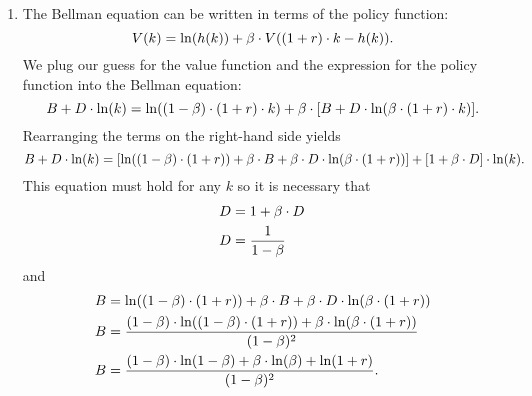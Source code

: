 \documentclass[letterpaper,12pt,leqno]{article}
\begin{document}
\begin{enumerate}
\item The Bellman equation can be written in terms of the policy function:
\[V(k)=\ln(h(k))+\b\cdot V((1+r)\cdot k-h(k)).\]
We plug our guess for the value function and the expression for the policy function into the Bellman equation:
\[B+D\cdot \ln(k)=\ln((1-\b)\cdot (1+r)\cdot k)+\b\cdot[B+D\cdot \ln(\b\cdot (1+r) \cdot k)].\] 
Rearranging the terms on the right-hand side yields
\[B+D\cdot \ln(k)=[\ln((1-\b)\cdot (1+r))+\b\cdot B+\b\cdot D\cdot \ln(\b\cdot (1+r))]+[1+\b\cdot D]\cdot \ln(k).\] 
This equation must hold for any $k$ so it is necessary that
\begin{align*}
D&=1+\beta\cdot D\\
D&=\frac{1}{1-\beta}
\end{align*}
and
\begin{align*}
B&=\ln((1-\b)\cdot (1+r))+\b\cdot B+\b\cdot D\cdot \ln(\b\cdot (1+r))\\
B&=\frac{(1-\b)\cdot \ln((1-\b)\cdot (1+r))+\b\cdot \ln(\b\cdot (1+r))}{(1-\b)^{2}}\\
B&=\frac{(1-\b)\cdot \ln(1-\b)+\b\cdot \ln(\b)+\ln(1+r)}{(1-\b)^{2}}.
\end{align*}
\end{enumerate}
\end{document}
